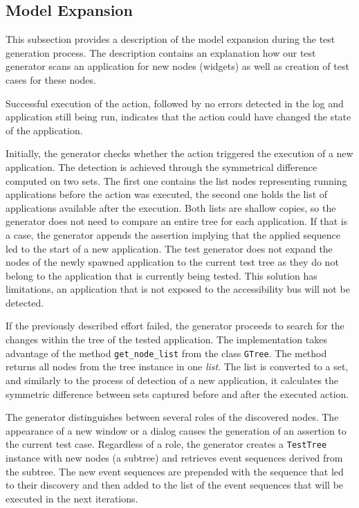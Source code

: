 \subsection{Model Expansion}
This subsection provides a description of the model expansion during the test generation process. The description contains an explanation how our test generator scans an application for new nodes (widgets) as well as creation of test cases for these nodes.

Successful execution of the action, followed by no errors detected in the log and application still being run, indicates that the action could have changed the state of the application. 

Initially, the generator checks whether the action triggered the execution of a new application. The detection is achieved through the symmetrical difference computed on two sets. The first one contains the list nodes representing running applications before the action was executed, the second one holds the list of applications available after the execution. Both lists are shallow copies, so the generator does not need to compare an entire tree for each application. If that is a case, the generator appends the assertion implying that the applied sequence led to the start of a new application. The test generator does not expand the nodes of the newly spawned application to the current test tree as they do not belong to the application that is currently being tested. This solution has limitations, an application that is not exposed to the accessibility bus will not be detected.

If the previously described effort failed, the generator proceeds to search for the changes within the tree of the tested application. The implementation takes advantage of the method \texttt{get\_node\_list} from the class \texttt{GTree}. The method returns all nodes from the tree instance in one \textit{list}. The list is converted to a set, and similarly to the process of detection of a new application, it calculates the symmetric difference between sets captured before and after the executed action. 

The generator distinguishes between several roles of the discovered nodes. The appearance of a new window or a dialog causes the generation of an assertion to the current test case. Regardless of a role, the generator creates a \texttt{TestTree} instance with new nodes (a subtree) and retrieves event sequences derived from the subtree. The new event sequences are prepended with the sequence that led to their discovery and then added to the list of the event sequences that will be executed in the next iterations.

